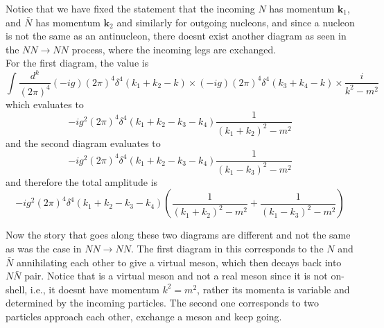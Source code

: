 \documentclass[11pt]{article}
\numberwithin{equation}{section}
\begin{document}
    Notice that we have fixed the statement that the incoming \(N\) has momentum \(\textbf{k}_1\), and \(\bar N\) has momentum \(\textbf{k}_2\) and similarly for outgoing nucleons, and since a nucleon is not the same as an antinucleon, there doesnt exist another diagram as seen in the \(NN\to NN\) process, where the incoming legs are exchanged.\\

    For the first diagram, the value is 
    \begin{equation*}
        \int \frac{d^k}{(2\pi)^4}(-ig)(2\pi)^4\delta^4(k_1 + k_2 - k)\times(-ig)(2\pi)^4\delta^4(k_3 + k_4 - k)\times \frac{i}{k^2 - m^2} 
    \end{equation*}
    which evaluates to 
    \begin{equation*}
        -ig^2(2\pi)^4\delta^4(k_1 + k_2 - k_3 - k_4)\frac{1}{(k_1 + k_2)^2 - m^2 } 
    \end{equation*}
    and the second diagram evaluates to 
    \begin{equation*}
        -ig^2(2\pi)^4\delta^4(k_1 + k_2 - k_3 - k_4)\frac{1}{(k_1 
    - k_3)^2 - m^2} 
    \end{equation*}
    and therefore the total amplitude is 
    \begin{equation*}
        -ig^2(2\pi)^4\delta^4(k_1 + k_2 - k_3 - k_4) \left(  \frac{1}{(k_1 + k_2)^2 - m^2} +    \frac{1}{(k_1 
    - k_3)^2 - m^2}    \right)
    \end{equation*}

    Now the story that goes along these two diagrams are different and not the same as was the case in \(NN\to NN\). The first diagram in this corresponds to the \(N\) and \(\bar{N}\) annihilating each other to give a virtual meson, which then decays back into \(N\bar{N}\) pair. Notice that is a virtual meson and not a real meson since it is not on-shell, i.e., it doesnt have momentum \(k^2 = m^2\), rather its momenta is variable and determined by the incoming particles. The second one corresponds to two particles approach each other, exchange a meson and keep going. 
    
\end{document}
